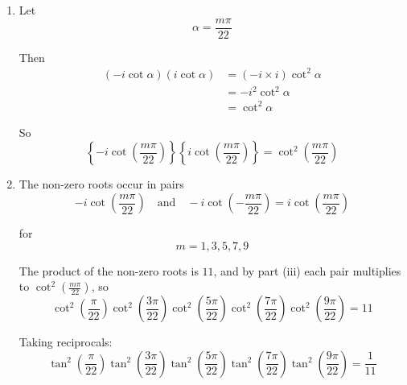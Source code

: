 \documentclass[leqno]{article}
\begin{document}
\begin{enumerate}[
  label=\textbf{\arabic*.},
  leftmargin=*,
  topsep=0pt,
  partopsep=0pt,
  parsep=0pt
]
\begin{djsSolution}
\begin{enumerate}[label=\textbf{(\roman*)}]
is also real. But the only real solution of $w^{11}=-1$ is $w=-1$, which gives
\[
z=\frac{-1+1}{-1-1}=0
\]

Hence there is exactly one real root, namely $0$, so the remaining $11-1=10$ roots are non-real.

Now rewrite the values with $m=13,15,17,19,21$. If $r=1,3,5,7,9$, then
\begin{align*}
-i\cot\left(\frac{(22-r)\pi}{22}\right)
&=-i\cot\left(\pi-\frac{r\pi}{22}\right) \\
&=-i\left(-\cot\left(\frac{r\pi}{22}\right)\right) \\
&=i\cot\left(\frac{r\pi}{22}\right) \\
&=-i\cot\left(-\frac{r\pi}{22}\right)
\end{align*}

Therefore the 10 non-real roots may be written as
\[
-i\cot\left(\frac{m\pi}{22}\right),
\qquad m=\pm1,\pm3,\pm5,\pm7,\pm9
\]

\item Let
\[
\alpha=\frac{m\pi}{22}
\]

Then
\begin{align*}
\left(-i\cot\alpha\right)\left(i\cot\alpha\right)
&=(-i\times i)\cot^2\alpha \\
&=-i^2\cot^2\alpha \\
&=\cot^2\alpha
\end{align*}

So
\[
\left\{-i\cot\left(\frac{m\pi}{22}\right)\right\}\left\{i\cot\left(\frac{m\pi}{22}\right)\right\}
=\cot^2\left(\frac{m\pi}{22}\right)
\]

\item The non-zero roots occur in pairs
\[
-i\cot\left(\frac{m\pi}{22}\right)
\quad \text{and} \quad
-i\cot\left(-\frac{m\pi}{22}\right)
=i\cot\left(\frac{m\pi}{22}\right)
\]

for
\[
m=1,3,5,7,9
\]

The product of the non-zero roots is $11$, and by part (iii) each pair multiplies to $\cot^2\left(\frac{m\pi}{22}\right)$, so
\[
\cot^2\left(\frac{\pi}{22}\right)
\cot^2\left(\frac{3\pi}{22}\right)
\cot^2\left(\frac{5\pi}{22}\right)
\cot^2\left(\frac{7\pi}{22}\right)
\cot^2\left(\frac{9\pi}{22}\right)
=11
\]

Taking reciprocals:
\[
\tan^2\left(\frac{\pi}{22}\right)
\tan^2\left(\frac{3\pi}{22}\right)
\tan^2\left(\frac{5\pi}{22}\right)
\tan^2\left(\frac{7\pi}{22}\right)
\tan^2\left(\frac{9\pi}{22}\right)
=\frac{1}{11}
\]
\end{enumerate}
\end{djsSolution}


\end{enumerate}
\end{document}

